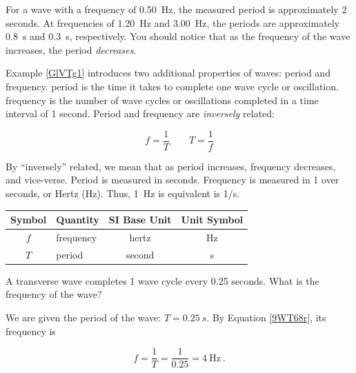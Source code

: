 \documentclass{article}
\numberwithin{equation}{section}
\numberwithin{figure}{section}
\begin{document}
\Solution For a wave with a frequency of \SI{0.50}{Hz}, the measured period is approximately 2 seconds. At frequencies of \SI{1.20}{Hz} and \SI{3.00}{Hz}, the periods are approximately \SI{0.8}{s} and \SI{0.3}{s}, respectively. You should notice that as the frequency of the wave increases, the period \textit{decreases}.

\solutionEnd

\vspace{1em}

Example \ref{GlVTg1} introduces two additional properties of waves: period and frequency. \Gls{period} is the time it takes to complete one wave cycle or oscillation. \Gls{frequency} is the number of wave cycles or oscillations completed in a time interval of 1 second. Period and frequency are \textit{inversely} related:

\begin{equation} \label{9WT68r}
    f = \frac{1}{T} \hspace{2em} 
    T = \frac{1}{f}
\end{equation}

By ``inversely'' related, we mean that as period increases, frequency decreases, and vice-verse. Period is measured in seconds. Frequency is measured in 1 over seconds, or Hertz (Hz). Thus, \SI{1}{Hz} is equivalent is 1/s.

\begin{center}
    \begin{tabular}{cl|cc}
    \hline
    \textbf{Symbol} & \textbf{Quantity} & \textbf{SI Base Unit} & \textbf{Unit Symbol}  \\
    \hline\hline
        $f$ & frequency & hertz & \si{\Hz}\\
        $T$ & period & second & s\\
    \hline
    \end{tabular}
\end{center}

\begin{example}
    A transverse wave completes 1 wave cycle every 0.25 seconds. What is the frequency of the wave?
\end{example}

\Solution We are given the period of the wave: $T = \SI{0.25}{s}$. By Equation \ref{9WT68r}, its frequency is

\begin{equation*}
    f = \frac{1}{T} = \frac{1}{0.25} = \SI{4}{\Hz}\ .
\end{equation*}
\end{document}
